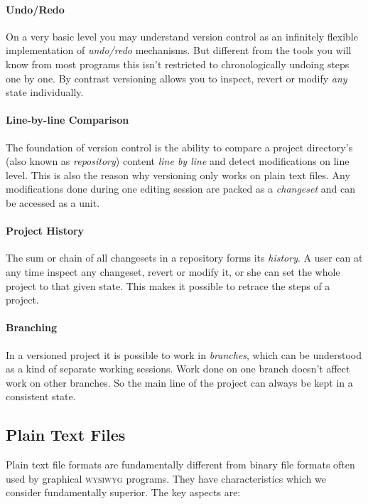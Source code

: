 \documentclass[11pt,a4paper]{article}
\begin{document}
\paragraph{Undo/Redo}
On a very basic level you may understand version control as an infinitely flexible
implementation of \emph{undo/redo} mechanisms. But different from the tools you will
know from most programs this isn't restricted to chronologically undoing steps one by
one. By contrast versioning allows you to inspect, revert or modify \emph{any} state
individually.

\paragraph{Line-by-line Comparison}
The foundation of version control is the ability to compare a project directory's (also
known as \emph{repository}) content \emph{line by line} and detect modifications on line
level. This is also the reason why versioning only works on plain text files.
Any modifications done during one editing session are packed as a \emph{changeset} and
can be accessed as a unit.

\paragraph{Project History}
The sum or chain of all changesets in a repository forms its \emph{history}. A user can 
at any time inspect any changeset, revert or modify it, or she can set the whole project
to that given state. This makes it possible to retrace the steps of a project.

\paragraph{Branching}
In a versioned project it is possible to work in \emph{branches}, which can be
understood as a kind of separate working sessions. Work done on one branch doesn't affect
work on other branches. So the main line of the project can always be kept in a consistent
state.

\subsection{Plain Text Files}
Plain text file formats are fundamentally different from binary file formats often
used by graphical \textsc{wysiwyg} programs. They have characteristics which we consider fundamentally superior. The key aspects are:
\end{document}
